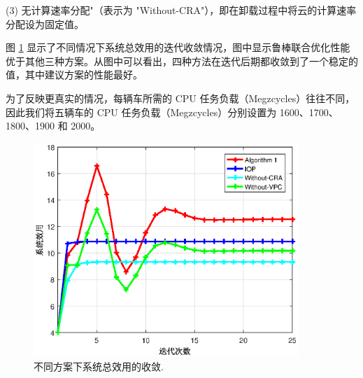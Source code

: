 (3) 无计算速率分配"（表示为 "Without-CRA"），即在卸载过程中将云的计算速率分配设为固定值。

图 \ref{F7} 显示了不同情况下系统总效用的迭代收敛情况，图中显示鲁棒联合优化性能优于其他三种方案。从图中可以看出，四种方法在迭代后期都收敛到了一个稳定的值，其中建议方案的性能最好。

为了反映更真实的情况，每辆车所需的 CPU 任务负载（Megzcycles）往往不同，因此我们将五辆车的 CPU 任务负载（Megzcycles）分别设置为 1600、1700、1800、1900 和 2000。

\begin{figure}[H]
\centering
\includegraphics[width=10cm]{figures//chap3//compare.eps}
\caption{不同方案下系统总效用的收敛.}
\label{F7}
\end{figure}

